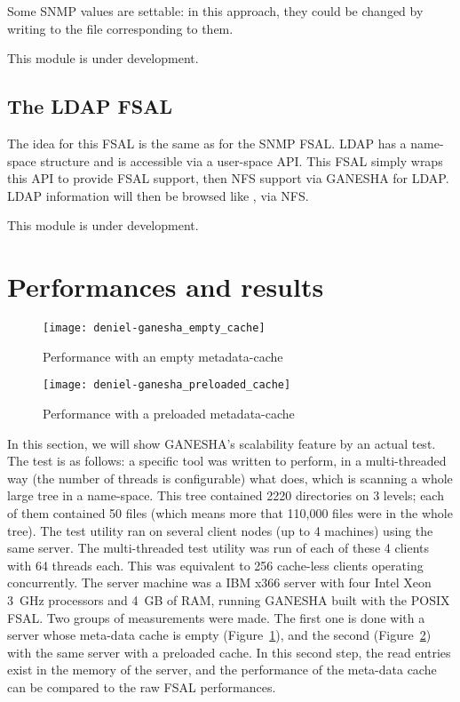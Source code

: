 \documentclass[final]{ols}
\begin{document}
Some SNMP values are settable: in this approach, they could be changed
by writing to the file corresponding to them.

This module is under development.

\subsection{The LDAP FSAL}

The idea for this FSAL is the same as for the SNMP FSAL. LDAP has a
name-space structure and is accessible via a user-space API. This FSAL
simply wraps this API to provide FSAL support, then NFS support via
GANESHA for LDAP. LDAP information will then be browsed like ,
via NFS.

This module is under development. 

\section{Performances and results}

\begin{figure}
\begin{center}
\texttt{[image: deniel-ganesha\_empty\_cache]}
\end{center}
\caption{Performance with an empty metadata-cache}
\label{empty_cache}
\end{figure}


\begin{figure}
\begin{center}
\texttt{[image: deniel-ganesha\_preloaded\_cache]}
\end{center}
\caption{Performance with a preloaded metadata-cache}
\label{loaded_cache}
\end{figure}


In this section, we will show GANESHA's scalability feature by an
actual test. The test is as follows: a specific tool was written
to perform, in a multi-threaded way (the number of threads is
configurable) what  does, which is scanning a whole large
tree in a name-space. This tree contained 2220 directories on 3
levels; each of them contained 50 files (which means more that 110,000
files were in the whole tree). The test utility ran on several client
nodes (up to 4 machines) using the same server.  The multi-threaded
test utility was run of each of these 4 clients with 64 threads each.
This was equivalent to 256 cache-less clients operating concurrently.
The server machine was a IBM x366 server with four Intel Xeon 3~GHz
processors and 4~GB of RAM, running GANESHA built with the POSIX FSAL.
Two groups of measurements were made. The first one is done with a server
whose meta-data cache is empty (Figure~\ref{empty_cache}), and the
second (Figure~\ref{loaded_cache}) with the same server with a
preloaded cache. In this second step, the read entries exist in the
memory of the server, and the performance of the meta-data cache can
be compared to the raw FSAL performances.
\end{document}
